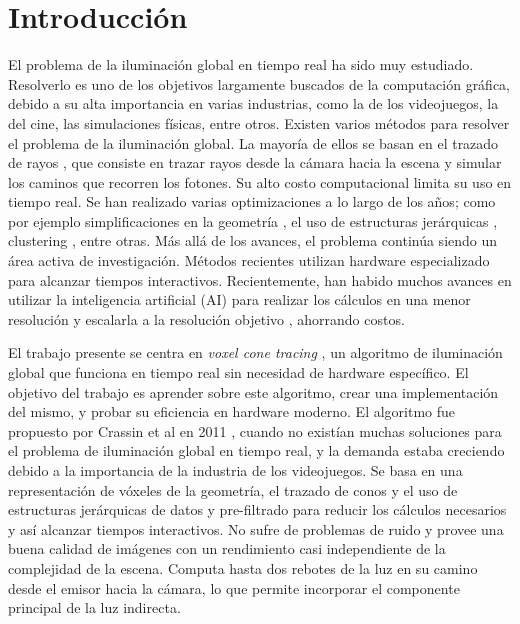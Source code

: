 \chapter{Introducción}


El problema de la iluminación global \cite[p.~437]{rtr} en tiempo real \cite[p.~1]{rtr} ha sido muy estudiado.
Resolverlo es uno de los objetivos largamente buscados de la computación gráfica, debido a su alta importancia en varias industrias, como la de los videojuegos, la del cine, las simulaciones físicas, entre otros.
Existen varios métodos para resolver el problema de la iluminación global.
La mayoría de ellos se basan en el trazado de rayos \cite{whitted-1980}, que consiste en trazar rayos desde la cámara hacia la escena y simular los caminos que recorren los fotones.
Su alto costo computacional limita su uso en tiempo real.
Se han realizado varias optimizaciones a lo largo de los años; como por ejemplo simplificaciones en la geometría \cite{gigavoxels}, el uso de estructuras jerárquicas \cite{real-time-photon-mapping}, clustering \cite{faster-photon-mapping}, entre otras.
Más allá de los avances, el problema continúa siendo un área activa de investigación.
Métodos recientes utilizan hardware especializado para alcanzar tiempos interactivos.
Recientemente, han habido muchos avances en utilizar la inteligencia artificial (AI) para realizar los cálculos en una menor resolución y escalarla a la resolución objetivo \cite{image-super-resolution-survey}, ahorrando costos.

El trabajo presente se centra en \textit{voxel cone tracing} \cite{voxel-cone-tracing}, un algoritmo de iluminación global que funciona en tiempo real sin necesidad de hardware específico.
El objetivo del trabajo es aprender sobre este algoritmo, crear una implementación del mismo, y probar su eficiencia en hardware moderno.
El algoritmo fue propuesto por Crassin et al en 2011 \cite{voxel-cone-tracing}, cuando no existían muchas soluciones para el problema de iluminación global en tiempo real, y la demanda estaba creciendo debido a la importancia de la industria de los videojuegos.
Se basa en una representación de vóxeles \cite[p.~578]{rtr} de la geometría, el trazado de conos \cite{ray-tracing-with-cones} y el uso de estructuras jerárquicas de datos y pre-filtrado para reducir los cálculos necesarios y así alcanzar tiempos interactivos.
No sufre de problemas de ruido y provee una buena calidad de imágenes con un rendimiento casi independiente de la complejidad de la escena.
Computa hasta dos rebotes de la luz en su camino desde el emisor hacia la cámara, lo que permite incorporar el componente principal de la luz indirecta.

